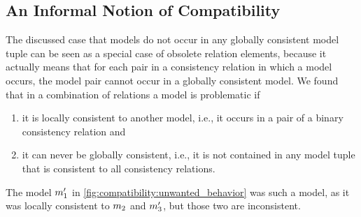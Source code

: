 


\subsection{An Informal Notion of Compatibility}

The discussed case that models do not occur in any globally consistent model tuple can be seen as a special case of obsolete relation elements, because it actually means that for each pair in a consistency relation in which a model occurs, the model pair cannot occur in a globally consistent model.
We found that in a combination of relations a model is problematic if
\begin{enumerate}
    \item it is locally consistent to another model, i.e., it occurs in a pair of a binary consistency relation and
    \item it can never be globally consistent, i.e., it is not contained in any model tuple that is consistent to all consistency relations.
\end{enumerate}
The model $m_{1}'$ in \autoref{fig:compatibility:unwanted_behavior} was such a model, as it was locally consistent to $m_{2}$ and $m_{3}'$, but those two are inconsistent.

